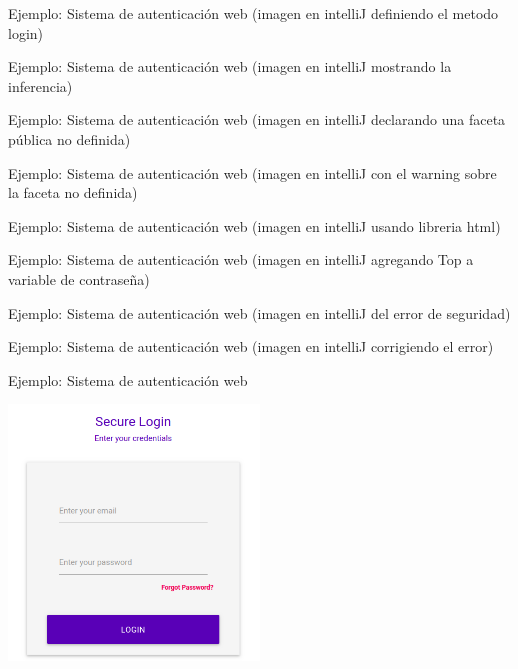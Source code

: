 \documentclass[aspectratio=169,10pt]{beamer}
\begin{document}
\begin{frame}[fragile]{Ejemplo: Sistema de autenticación web}
	(imagen en intelliJ definiendo el metodo login)
\end{frame}

\begin{frame}[fragile]{Ejemplo: Sistema de autenticación web}
	(imagen en intelliJ mostrando la inferencia)
\end{frame}

\begin{frame}[fragile]{Ejemplo: Sistema de autenticación web}
	(imagen en intelliJ declarando una faceta pública no definida)
\end{frame}

\begin{frame}[fragile]{Ejemplo: Sistema de autenticación web}
	(imagen en intelliJ con el warning sobre la faceta no definida)
\end{frame}

\begin{frame}[fragile]{Ejemplo: Sistema de autenticación web}
	(imagen en intelliJ usando libreria html)
\end{frame}

\begin{frame}[fragile]{Ejemplo: Sistema de autenticación web}
	(imagen en intelliJ agregando Top a variable de contraseña)
\end{frame}

\begin{frame}[fragile]{Ejemplo: Sistema de autenticación web}
	(imagen en intelliJ del error de seguridad)
\end{frame}

\begin{frame}[fragile]{Ejemplo: Sistema de autenticación web}
	(imagen en intelliJ corrigiendo el error)
\end{frame}

\begin{frame}[fragile]{Ejemplo: Sistema de autenticación web}
	\begin{center}
		\includegraphics[width=0.5\textwidth]{images/screen4.png}
	\end{center}
\end{frame}
\end{document}
